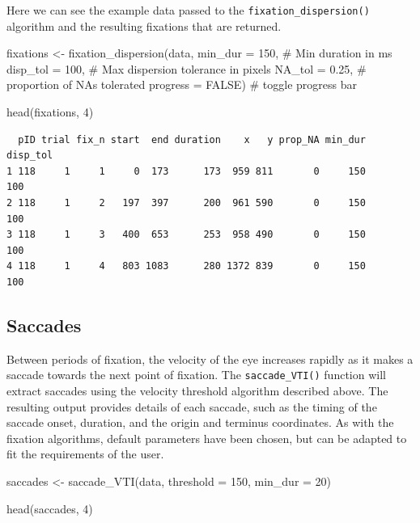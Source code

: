 \documentclass[
  man,
  floatsintext,
  longtable,
  nolmodern,
  notxfonts,
  notimes,
  colorlinks=true,linkcolor=blue,citecolor=blue,urlcolor=blue]{apa7}
\newenvironment{Shaded}{\begin{snugshade}}{\end{snugshade}}
\newcommand{\AttributeTok}[1]{\textcolor[rgb]{0.40,0.45,0.13}{#1}}
\newcommand{\CommentTok}[1]{\textcolor[rgb]{0.37,0.37,0.37}{#1}}
\newcommand{\ConstantTok}[1]{\textcolor[rgb]{0.56,0.35,0.01}{#1}}
\newcommand{\DecValTok}[1]{\textcolor[rgb]{0.68,0.00,0.00}{#1}}
\newcommand{\FloatTok}[1]{\textcolor[rgb]{0.68,0.00,0.00}{#1}}
\newcommand{\FunctionTok}[1]{\textcolor[rgb]{0.28,0.35,0.67}{#1}}
\newcommand{\NormalTok}[1]{\textcolor[rgb]{0.00,0.23,0.31}{#1}}
\newcommand{\OtherTok}[1]{\textcolor[rgb]{0.00,0.23,0.31}{#1}}
\begin{document}
Here we can see the example data passed to the
\texttt{fixation\_dispersion()} algorithm and the resulting fixations
that are returned.

\begin{Shaded}
\begin{Highlighting}[]
\NormalTok{fixations }\OtherTok{\textless{}{-}} 
  \FunctionTok{fixation\_dispersion}\NormalTok{(data,}
                      \AttributeTok{min\_dur =} \DecValTok{150}\NormalTok{, }\CommentTok{\# Min duration in ms}
                      \AttributeTok{disp\_tol =} \DecValTok{100}\NormalTok{, }\CommentTok{\# Max dispersion tolerance in pixels}
                      \AttributeTok{NA\_tol =} \FloatTok{0.25}\NormalTok{, }\CommentTok{\# proportion of NAs tolerated }
                      \AttributeTok{progress =} \ConstantTok{FALSE}\NormalTok{) }\CommentTok{\# toggle progress bar}
                   

\FunctionTok{head}\NormalTok{(fixations, }\DecValTok{4}\NormalTok{)}
\end{Highlighting}
\end{Shaded}

\begin{verbatim}
  pID trial fix_n start  end duration    x   y prop_NA min_dur disp_tol
1 118     1     1     0  173      173  959 811       0     150      100
2 118     1     2   197  397      200  961 590       0     150      100
3 118     1     3   400  653      253  958 490       0     150      100
4 118     1     4   803 1083      280 1372 839       0     150      100
\end{verbatim}

\subsection{Saccades}\label{saccades}

Between periods of fixation, the velocity of the eye increases rapidly
as it makes a saccade towards the next point of fixation. The
\texttt{saccade\_VTI()} function will extract saccades using the
velocity threshold algorithm described above. The resulting output
provides details of each saccade, such as the timing of the saccade
onset, duration, and the origin and terminus coordinates. As with the
fixation algorithms, default parameters have been chosen, but can be
adapted to fit the requirements of the user.

\begin{Shaded}
\begin{Highlighting}[]
\NormalTok{saccades }\OtherTok{\textless{}{-}} \FunctionTok{saccade\_VTI}\NormalTok{(data,}
                        \AttributeTok{threshold =} \DecValTok{150}\NormalTok{,}
                        \AttributeTok{min\_dur =} \DecValTok{20}\NormalTok{)}

\FunctionTok{head}\NormalTok{(saccades, }\DecValTok{4}\NormalTok{)}
\end{Highlighting}
\end{Shaded}
\end{document}
